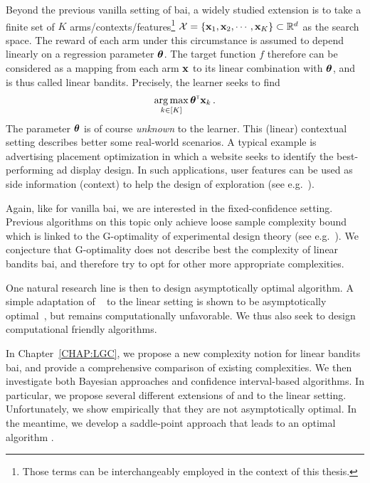 Beyond the previous vanilla setting of \gls{bai}, a widely studied extension is to take a finite set of $K$ arms/contexts/features\footnote{Those terms can be interchangeably employed in the context of this thesis.} $\mathcal{X}=\{{\bf x}_1,{\bf x}_2,\cdots,{\bf x}_K\}\subset\mathbb{R}^d$ as the search space. The reward of each arm under this circumstance is assumed to depend linearly on a \gls{regression parameter} ${\boldsymbol \theta}$. The target function $f$ therefore can be considered as a mapping from each arm ${\bf x}$ to its linear combination with ${\boldsymbol \theta}$, and is thus called linear bandits. Precisely, the learner seeks to find
\begin{align}\label{eq:optim_linbai}
    \operatorname*{arg\,max}_{k\in[K]} {\boldsymbol \theta}^{\mathsf{\scriptscriptstyle T}}{\bf x}_k\,.
\end{align}
The parameter ${\boldsymbol \theta}$ is of course \emph{unknown} to the learner. This (linear) contextual setting describes better some real-world scenarios. A typical example is advertising placement optimization in which a website seeks to identify the best-performing ad display design. In such applications, user features can be used as side information (context) to help the design of exploration (see e.g.~\citealt{li2010contextual}).

Again, like for vanilla \gls{bai}, we are interested in the fixed-confidence setting. Previous algorithms on this topic only achieve loose sample complexity bound which is linked to the \gls{G-optimality} of experimental design theory (see e.g.~\citealt{pukelsheim2006optimal}). We conjecture that G-optimality does not describe best the complexity of linear bandits \gls{bai}, and therefore try to opt for other more appropriate complexities.

One natural research line is then to design asymptotically optimal algorithm. A simple adaptation of \Track~\citep{garivier2016tracknstop} to the linear setting is shown to be asymptotically optimal~\citep{jedra2020linear}, but remains computationally unfavorable. We thus also seek to design computational friendly algorithms. 

In Chapter~\ref{CHAP:LGC}, we propose a new complexity notion for linear bandits \gls{bai}, and provide a comprehensive comparison of existing complexities. We then investigate both Bayesian approaches and confidence interval-based algorithms. In particular, we propose several different extensions of \TTTS{} and \TCC{} to the linear setting. Unfortunately, we show empirically that they are not asymptotically optimal. In the meantime, we develop a saddle-point approach that leads to an optimal algorithm \LG{}.

